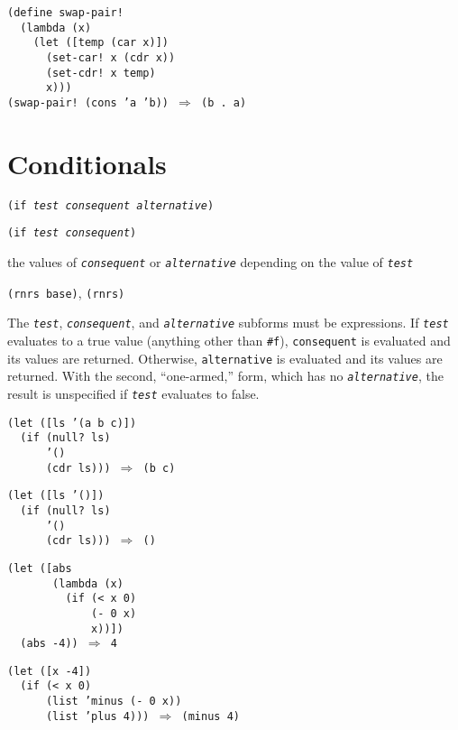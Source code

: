 \begin{alltt}
(define swap-pair!
  (lambda (x)
    (let ([temp (car x)])
      (set-car! x (cdr x))
      (set-cdr! x temp)
      x)))
(swap-pair! (cons 'a 'b)) \(\Rightarrow\) (b . a)
\end{alltt}

\section{\label{control_g99}\label{control_h3}Conditionals\label{control_SECTCONDITIONALS}}


\begin{description}

\label{control_s8}\item[syntax] \texttt{(if \textit{test} \textit{consequent} \textit{alternative})}



\item[syntax] \texttt{(if \textit{test} \textit{consequent})}



\item[returns] the values of \texttt{\textit{consequent}} or \texttt{\textit{alternative}} depending on the
value of \texttt{\textit{test}}


\item[libraries] \texttt{(rnrs base)}, \texttt{(rnrs)}
\end{description}


\label{control_s9}The \texttt{\textit{test}}, \texttt{\textit{consequent}}, and \texttt{\textit{alternative}} subforms must be
expressions.
If \texttt{\textit{test}} evaluates to a true value (anything other than \texttt{\#{}f}),
\texttt{consequent} is evaluated and its values are returned.
Otherwise, \texttt{alternative} is evaluated and its values are returned.
With the second, ``one-armed,'' form, which has no \texttt{\textit{alternative}},
the result is unspecified if \texttt{\textit{test}} evaluates to false.


\begin{alltt}
(let ([ls '(a b c)])
  (if (null? ls)
      '()
      (cdr ls))) \(\Rightarrow\) (b c)

(let ([ls '()])
  (if (null? ls)
      '()
      (cdr ls))) \(\Rightarrow\) ()

(let ([abs
       (lambda (x)
         (if (\textless{} x 0)
             (- 0 x)
             x))])
  (abs -4)) \(\Rightarrow\) 4

(let ([x -4])
  (if (\textless{} x 0)
      (list 'minus (- 0 x))
      (list 'plus 4))) \(\Rightarrow\) (minus 4)
\end{alltt}

